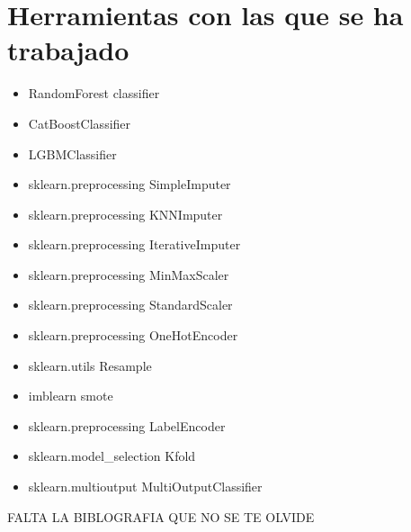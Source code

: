 \documentclass[twoside,openright,titlepage,numbers=noenddot,openany,headinclude,footinclude=true,
cleardoublepage=empty,abstractoff,BCOR=5mm,paper=a4,fontsize=12pt,main=spanish]{scrreprt}
\begin{document}
\newpage
\section{Herramientas con las que se ha trabajado}

\begin{itemize}
\item RandomForest classifier
\item CatBoostClassifier
\item LGBMClassifier
\item sklearn.preprocessing SimpleImputer
\item sklearn.preprocessing KNNImputer
\item sklearn.preprocessing IterativeImputer
\item sklearn.preprocessing MinMaxScaler
\item sklearn.preprocessing StandardScaler
\item sklearn.preprocessing OneHotEncoder
\item sklearn.utils Resample
\item imblearn smote
\item sklearn.preprocessing LabelEncoder
\item sklearn.model\_selection Kfold
\item sklearn.multioutput MultiOutputClassifier


\end{itemize}





%
\newpage


FALTA LA BIBLOGRAFIA QUE NO SE TE OLVIDE

{}


\end{document}
